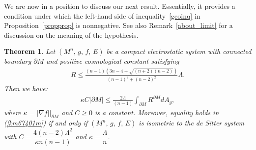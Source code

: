 \documentclass{amsart}
\newtheorem{theorem}{Theorem}
\numberwithin{equation}{section}
\begin{document}
We are now in a position to discuss our next result. Essentially, it provides a condition under which the left-hand side of inequality~\eqref{geoinq} in Proposition~\ref{propprop} is nonnegative. See also Remark~\ref{about_limit} for a discussion on the meaning of the hypothesis.




\begin{theorem}\label{geometricineq}
	Let $(M^{n},\,g,\,f,\,E)$ be a compact electrostatic system with connected boundary $\partial M$ and positive cosmological constant satisfying
	\begin{eqnarray}\label{upper_bound}
		R \leq  \frac{(n-1)\left({3n-4} + \sqrt{(n+2)(n-2)}\right)}{(n-1)^2+(n-2)^2}\Lambda.
	\end{eqnarray}
	Then we have:
	\begin{eqnarray}
		\label{km67401m}
		\kappa C\vert\partial M\vert \leq \frac{2\Lambda}{(n-1)}\int_{\partial M} R^{\partial M}dA_g,
	\end{eqnarray}
	where $\kappa = \vert\nabla f\vert\Big|_{\partial M}$ and $C\geq 0$ is a constant. Moreover, equality holds in (\ref{km67401m}) if and only if $(M^{n},\,g,\,f,\,E)$ is isometric to the de Sitter system with $C=\dfrac{4(n-2)\Lambda^2}{\kappa n(n - 1)}$ and $\kappa = \dfrac{\Lambda}{n}$.
\end{theorem}
\end{document}
